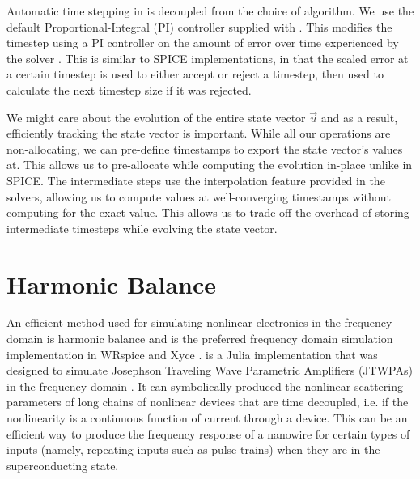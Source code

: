 Automatic time stepping in  is decoupled from the choice of algorithm.
We use the default Proportional-Integral (PI) controller supplied with .
This modifies the timestep using a PI controller on the amount of error over time experienced by the
solver \cite{timestepping_alg_PI}. 
This is similar to SPICE implementations, in that the scaled error at a certain timestep is used to either
accept or reject a timestep, then used to calculate the next timestep size if it was rejected.

We might care about the evolution of the entire state vector $\vec u$ and as a result, efficiently
tracking the state vector is important. While all our operations are non-allocating, we can pre-define
timestamps to export the state vector's values at. This allows us to pre-allocate while computing
the evolution in-place unlike in SPICE. The intermediate steps use the interpolation feature provided
in the solvers, allowing us to compute values at well-converging timestamps without computing for the
exact value. This allows us to trade-off the overhead of storing intermediate timesteps while evolving
the state vector.


\section{Harmonic Balance} \label{julia-sim-hb}

An efficient method used for simulating nonlinear electronics in the frequency domain is harmonic balance
and is the preferred frequency domain simulation implementation in WRspice and Xyce \cite{wrspice, hb-book, xyce_reference}.  is a Julia implementation that was designed to simulate 
Josephson Traveling Wave Parametric Amplifiers (JTWPAs) in the frequency domain \cite{josephsoncircsjl}. 
It can symbolically produced the nonlinear scattering parameters of long chains of nonlinear devices
that are time decoupled, i.e. if the nonlinearity is a continuous function of current through a device.
This can be an efficient way to produce the frequency response of a nanowire for certain types of inputs
(namely, repeating inputs such as pulse trains) when they are in the superconducting state.


